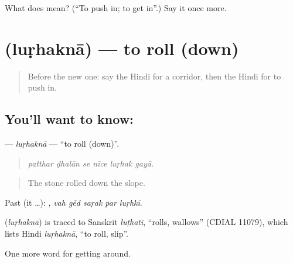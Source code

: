 \begin{tcolorbox}[breakable,colback=teal!4,colframe=teal!35!black,title={Before you move on}]
What does  mean? (\textquotedblleft{}To push in; to get in\textquotedblright{}.) Say it once more.
\end{tcolorbox}
\section[\texorpdfstring{\hi{लुढ़कना} (luṛhaknā)}{लुढ़कना (luṛhaknā)}]{ (luṛhaknā) — to roll (down)}

\label{lesson:HI-C420-lurhakna}



\begin{quote}
Before the new one: say the Hindi for a corridor, then the Hindi for to push in.
\end{quote}

\subsection*{You'll want to know: }
\textbf{} — \emph{luṛhaknā} — \textquotedblleft{}to roll (down)\textquotedblright{}.

\begin{quote}
     
\end{quote}

\begin{quote}
\emph{patthar ḍhalān se nīce luṛhak gayā.}
\end{quote}

\begin{quote}
The stone rolled down the slope.
\end{quote}

Past (it …):     , \emph{vah gẽd saṛak par luṛhkī}.

\begin{cousinweb}
\textbf{} (\emph{luṛhaknā}) is traced to Sanskrit \emph{luṭhati}, \textquotedblleft{}rolls, wallows\textquotedblright{} (CDIAL 11079), which lists Hindi \emph{luṛhaknā}, \textquotedblleft{}to roll, slip\textquotedblright{}.
\end{cousinweb}

\begin{grammarlens}[title={What you've built}]
One more word for getting around.
\end{grammarlens}


